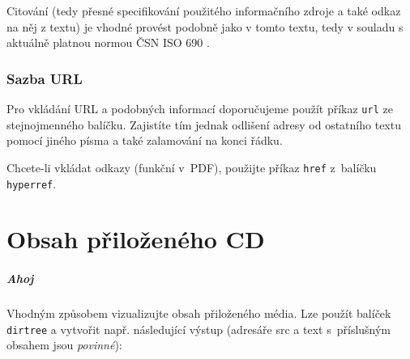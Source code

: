 \documentclass[thesis=B,czech]{FITthesis}[2012/10/20]
\begin{document}
Citování (tedy přesné specifikování použitého informačního zdroje a také odkaz na něj z textu) je vhodné provést podobně jako v tomto textu, tedy v souladu s aktuálně platnou normou ČSN ISO 690 \cite{iso690}.

\subsection{Sazba URL}

Pro vkládání URL a podobných informací doporučujeme použít příkaz \verb|url| ze stejnojmenného balíčku. Zajistíte tím jednak odlišení adresy od ostatního textu pomocí jiného písma a také zalamování na konci řádku.

Chcete-li vkládat odkazy (funkční v~PDF), použijte příkaz \verb|href| z~balíčku \verb|hyperref|.


\chapter{Obsah přiloženého CD}

\paragraph{Ahoj}

Vhodným způsobem vizualizujte obsah přiloženého média. Lze použít balíček \verb|dirtree| a vytvořit např. následující výstup (adresáře src a text s~příslušným obsahem jsou \emph{povinné}):

\begin{figure}
\end{figure}
\end{document}
